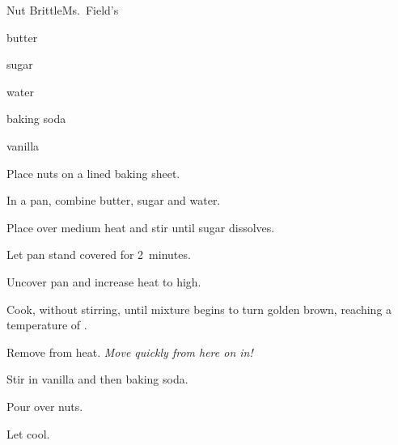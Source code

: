 \begin{recipe}{Nut Brittle}{Ms.~Field's}{}

\begin{ingredients}
\item \C{1\half} 
\item {} butter
\item {} sugar
\item \C{\quarter} water
\item \tp{\quarter} baking soda
\item {} vanilla
\end{ingredients}

\begin{directions}
\item Place nuts on a lined baking sheet.
\item In a pan, combine butter, sugar and water.
\item Place over medium heat and stir until sugar dissolves.
\item Let pan stand covered for 2~minutes.
\item Uncover pan and increase heat to high.
\item Cook, without stirring, until mixture begins to turn golden brown, reaching a temperature of .
\item Remove from heat. \emph{ Move quickly from here on in! }
\item Stir in vanilla and then baking soda.
\item Pour over nuts.
\item Let cool.
\end{directions}

\end{recipe}
